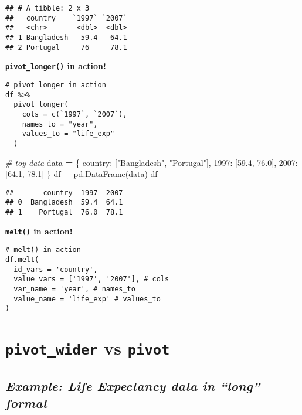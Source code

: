 \documentclass[
]{book}
\newenvironment{Shaded}{\begin{snugshade}}{\end{snugshade}}
\newcommand{\CommentTok}[1]{\textcolor[rgb]{0.56,0.35,0.01}{\textit{#1}}}
\newcommand{\FloatTok}[1]{\textcolor[rgb]{0.00,0.00,0.81}{#1}}
\newcommand{\NormalTok}[1]{#1}
\newcommand{\OperatorTok}[1]{\textcolor[rgb]{0.81,0.36,0.00}{\textbf{#1}}}
\newcommand{\StringTok}[1]{\textcolor[rgb]{0.31,0.60,0.02}{#1}}
\begin{document}
\begin{verbatim}
## # A tibble: 2 x 3
##   country    `1997` `2007`
##   <chr>       <dbl>  <dbl>
## 1 Bangladesh   59.4   64.1
## 2 Portugal     76     78.1
\end{verbatim}

{\textbf{\texttt{pivot\_longer()} in action!}}

\begin{verbatim}
# pivot_longer in action
df %>% 
  pivot_longer(
    cols = c(`1997`, `2007`),
    names_to = "year",
    values_to = "life_exp"
  )
\end{verbatim}

\begin{Shaded}
\begin{Highlighting}[]
\CommentTok{\# toy data}
\NormalTok{data }\OperatorTok{=}\NormalTok{ \{}
  \StringTok{\textquotesingle{}country\textquotesingle{}}\NormalTok{: [}\StringTok{"Bangladesh"}\NormalTok{, }\StringTok{"Portugal"}\NormalTok{],}
  \StringTok{\textquotesingle{}1997\textquotesingle{}}\NormalTok{: [}\FloatTok{59.4}\NormalTok{, }\FloatTok{76.0}\NormalTok{],}
  \StringTok{\textquotesingle{}2007\textquotesingle{}}\NormalTok{: [}\FloatTok{64.1}\NormalTok{, }\FloatTok{78.1}\NormalTok{]}
\NormalTok{\}}
\NormalTok{df }\OperatorTok{=}\NormalTok{ pd.DataFrame(data)}
\NormalTok{df}
\end{Highlighting}
\end{Shaded}

\begin{verbatim}
##       country  1997  2007
## 0  Bangladesh  59.4  64.1
## 1    Portugal  76.0  78.1
\end{verbatim}

{\textbf{\texttt{melt()} in action!}}

\begin{verbatim}
# melt() in action
df.melt(
  id_vars = 'country',
  value_vars = ['1997', '2007'], # cols
  var_name = 'year', # names_to
  value_name = 'life_exp' # values_to
)
\end{verbatim}

\hypertarget{pivot_wider-vs-pivot}{%
\section{\texorpdfstring{\texttt{pivot\_wider} vs \texttt{pivot}}{pivot\_wider vs pivot}}\label{pivot_wider-vs-pivot}}

\hypertarget{example-life-expectancy-data-in-long-format}{%
\subsection{\texorpdfstring{\emph{Example: Life Expectancy data in ``long'' format}}{Example: Life Expectancy data in ``long'' format}}\label{example-life-expectancy-data-in-long-format}}
\end{document}
